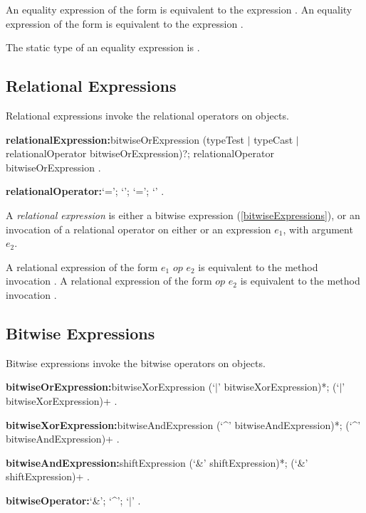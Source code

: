 \documentclass{article}
\begin{document}
\LMHash{}
An equality expression of the form  is equivalent to the expression .
An equality expression of the form  is equivalent to the expression .


\LMHash{}
The static type of an equality expression is .


\subsection{Relational Expressions}

\LMHash{}
Relational expressions invoke the relational operators on objects.

\begin{grammar}
{\bf relationalExpression:}bitwiseOrExpression (typeTest $|$ typeCast $|$
  \gnewline{} relationalOperator bitwiseOrExpression)?;
  \SUPER{} relationalOperator bitwiseOrExpression
  .

{\bf relationalOperator:}`{\escapegrammar \gt=}';
  `{\escapegrammar \gt}';
  `{\escapegrammar \lt}=';
  `{\escapegrammar \lt}'
  .
\end{grammar}

\LMHash{}
A {\em relational expression} is either a bitwise expression (\ref{bitwiseExpressions}), or an invocation of a relational operator on either \SUPER{} or an expression $e_1$, with argument $e_2$.

\LMHash{}
A relational expression of the form $e_1$ $op$ $e_2$ is equivalent to the method invocation .
A relational expression of the form \SUPER{} $op$ $e_2$ is equivalent to the method invocation .


\subsection{Bitwise Expressions}

\LMHash{}
Bitwise expressions invoke the bitwise operators on objects.

\begin{grammar}
{\bf bitwiseOrExpression:}bitwiseXorExpression (`$|$' bitwiseXorExpression)*;
  \SUPER{} (`$|$' bitwiseXorExpression)+
  .

{\bf bitwiseXorExpression:}bitwiseAndExpression (`\^{}' bitwiseAndExpression)*;
  \SUPER{} (`\^{}' bitwiseAndExpression)+
  .

{\bf bitwiseAndExpression:}shiftExpression (`\&' shiftExpression)*;
  \SUPER{} (`\&' shiftExpression)+
  .

{\bf bitwiseOperator:}`\&';
  `\^{}';
  `$|$'
  .
\end{grammar}
\end{document}

